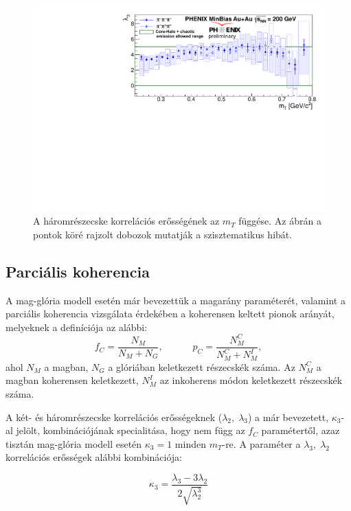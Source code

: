 \documentclass[11pt,a4paper]{article}
\numberwithin{equation}{subsection}
\numberwithin{figure}{section}
\begin{document}
\begin{figure}[H]
\centering
\includegraphics[scale=0.75]{pic/res/lambda3.pdf}
\caption{A háromrészecske korrelációs erősségének az $m_T$ függése. Az ábrán a pontok köré rajzolt dobozok mutatják a szisztematikus hibát.}
\label{fig:lambda3}
\end{figure}

\subsection{Parciális koherencia}

A mag-glória modell esetén már bevezettük a magarány paraméterét, valamint a parciális koherencia vizsgálata érdekében a koherensen keltett pionok arányát, melyeknek a definíciója az alábbi:
\begin{equation}
f_C=\frac{N_M}{N_M+N_G},\;\;\;\;\;\;\;\;\;\;\;p_C = \frac{N_M^C}{N_M^C+N_M^I},
\end{equation}
ahol $N_M$ a magban, $N_G$ a glóriában keletkezett részecskék száma. Az $N_M^C$ a magban koherensen keletkezett, $N_M^I$ az inkoherens módon keletkezett részecskék száma.

A két- és háromrészecske korrelációs erősségeknek ($\lambda_2,\;\lambda_3$) a már bevezetett, $\kappa_3$-al jelölt, kombinációjának specialitása, hogy nem függ az $f_C$ paramétertől, azaz tisztán mag-glória modell esetén $\kappa_3=1$ minden $m_T$-re. A paraméter a $\lambda_3,\; \lambda_2$ korrelációs erősségek alábbi kombinációja:

\begin{equation}
\kappa_3 = \frac{\lambda_3-3\lambda_2}{2\sqrt{\lambda_2^3}}
\end{equation}
\end{document}
